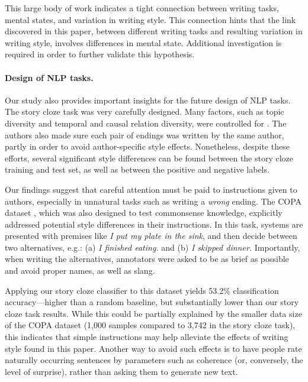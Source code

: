 \documentclass[11pt,a4paper]{article}
\begin{document}
This large body of work indicates a tight connection between writing
tasks, mental states, and variation in writing style.
This connection hints that the link discovered in this paper, between
different writing tasks and resulting variation in writing style,
involves differences in mental state. 
Additional investigation is required in order to further validate this hypothesis.


\paragraph{Design of NLP tasks.}
Our study also provides important insights for the future design of NLP tasks. 
The story cloze task was very carefully designed. Many factors, such
as topic diversity and temporal and causal relation diversity,  were controlled for \cite{Mostafazadeh:2016}. 
The authors also made sure each pair of endings was written by the
same author, partly in order to avoid author-specific style effects.
 Nonetheless, despite these efforts, several significant style
 differences can be found between the story cloze training and test set, as well as between the positive and negative labels. 
 
Our findings suggest that careful attention must be paid to instructions given to authors, especially in unnatural tasks such as writing a {\it wrong} ending. 
The COPA dataset \cite{Roemmele:2011}, which was also designed to test commonsense knowledge, explicitly addressed potential style differences in their instructions. In this task,  systems are presented with premises like {\it I put my plate in the sink}, and then decide between two alternatives, e.g.: (a) {\it I finished eating.} and (b) {\it I skipped dinner.}
Importantly, when writing the alternatives,  annotators were asked to be as brief as possible and avoid proper names, as well as  slang. 

Applying our story cloze classifier to this dataset yields 53.2\% classification accuracy---higher than a random baseline, but substantially lower than our story cloze task results. 
While this could be partially explained by the smaller data size of the COPA dataset (1,000 samples compared to 3,742 in the story cloze task), this indicates that simple instructions may help alleviate the effects of writing style found in this paper.
Another way to avoid such effects is to have people rate naturally occurring sentences  by parameters
such as coherence (or, conversely, the level of surprise),
rather than asking them to generate new text.
\end{document}
